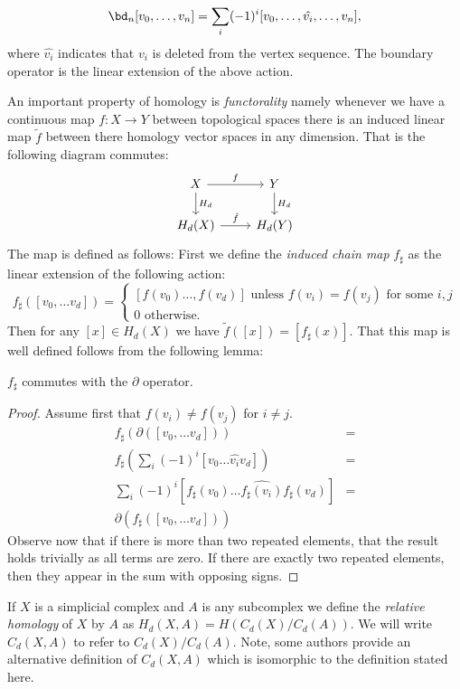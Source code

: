 \begin{equation*}
\bd_n [v_0,\ldots,v_n] = \sum_i (-1)^i [v_0,\ldots,\hat{v_i},\ldots,v_n],
\end{equation*}
where $\hat{v_i}$ indicates that $v_i$ is deleted from the vertex 
sequence. The boundary operator is the linear extension of the above action.

An important property of homology is \emph{functorality} namely whenever we have a continuous map $f: X \rightarrow Y$ between topological spaces there is an induced linear map $\tilde{f}$ between there homology vector spaces in any dimension. That is the following diagram commutes:
\[ \begin{tikzcd}
X \arrow{r}{f}\arrow{d}{H_d} & Y \arrow{d}{H_d} \\
H_d(X) \arrow{r}{\tilde{f}} & H_d(Y)
\end{tikzcd} \]
The map is defined as follows: First we define the \emph{induced chain map} $f_\sharp$ as the linear extension of the following action: 
\[ f_\sharp([v_0, \ldots v_d]) = 
\begin{cases} 
    [f(v_0) \ldots, f(v_d)] \textrm{ unless } f(v_i) = f(v_j) \textrm{ for some } i,j \\
    0 \textrm{ otherwise. }
   \end{cases}
\]
Then for any $[x] \in H_d(X)$ we have $\tilde{f}([x]) = [f_{\sharp}(x)]$.  That this map is well defined follows from 
the following lemma:
\begin{lemma}
$f_\sharp$ commutes with the $\partial$ operator. 
\end{lemma}
\begin{proof}
Assume first that $f(v_i) \neq f(v_j)$ for $i \neq j$.
\begin{align*}
f_\sharp(\partial([v_0, \ldots v_d])) &= \\
f_{\sharp}(\sum_i (-1)^i[v_0 \ldots \hat{v_i} v_d]) &= \\
\sum_i(-1)^i [f_{\sharp}(v_0) \ldots \hat{f_{\sharp}(v_i)} f_{\sharp}(v_d)] &= \\
\partial(f_\sharp([v_0, \ldots v_d]))
\end{align*}
Observe now that if there is more than two repeated elements, that the result holds trivially as all terms are zero. If there are exactly two repeated elements, then they appear
in the sum with opposing signs. 
\end{proof}

If $X$ is a simplicial complex and $A$ is any subcomplex we define the \emph{relative homology} of $X$ by $A$ as $H_d(X,A) = H(C_d(X)/C_d(A))$. We will write $C_d(X,A)$ to refer to $C_d(X)/C_d(A)$. Note, some authors provide an alternative definition of $C_d(X,A)$ which is isomorphic to the definition stated here.

